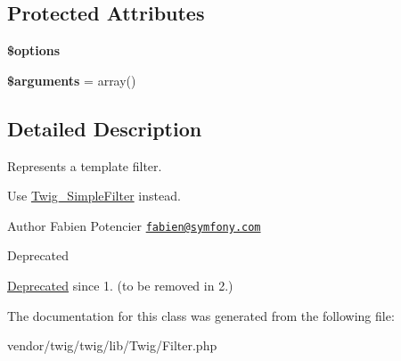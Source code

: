 \subsection*{Protected Attributes}
\begin{DoxyCompactItemize}
\item 
{\bfseries \$options}\hypertarget{classTwig__Filter_a4b5a3fdab126377458adc552f6b882aa}{}\label{classTwig__Filter_a4b5a3fdab126377458adc552f6b882aa}

\item 
{\bfseries \$arguments} = array()\hypertarget{classTwig__Filter_a189af367452b2e0fcdf4ceb07004b5cc}{}\label{classTwig__Filter_a189af367452b2e0fcdf4ceb07004b5cc}

\end{DoxyCompactItemize}


\subsection{Detailed Description}
Represents a template filter.

Use \hyperlink{classTwig__SimpleFilter}{Twig\+\_\+\+Simple\+Filter} instead.

\begin{DoxyAuthor}{Author}
Fabien Potencier \href{mailto:fabien@symfony.com}{\tt fabien@symfony.\+com}
\end{DoxyAuthor}
\begin{DoxyRefDesc}{Deprecated}
\item[\hyperlink{deprecated__deprecated000020}{Deprecated}]since 1. (to be removed in 2.) \end{DoxyRefDesc}


The documentation for this class was generated from the following file\+:\begin{DoxyCompactItemize}
\item 
vendor/twig/twig/lib/\+Twig/Filter.\+php\end{DoxyCompactItemize}
